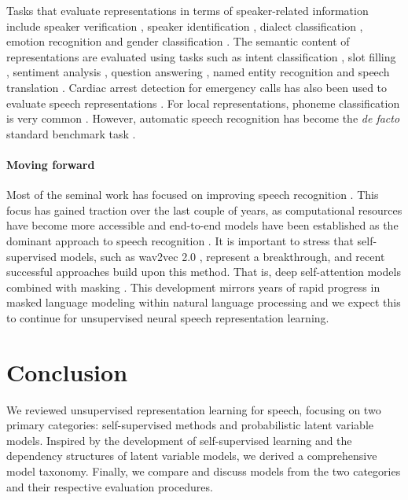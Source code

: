 {Tasks that evaluate representations in terms of speaker-related information include speaker verification \cite{hsu_unsupervised_2017, khurana_factorial_2019, milde_unspeech_2018}, speaker identification \cite{oord_representation_2018, jati_neural_2019, chung_unsupervised_2019, liu_nonautoregressive_2020}, dialect classification \cite{khurana_factorial_2019}, emotion recognition \cite{pascual_learning_2019, yang_superb_2021} and gender classification \cite{lee_unsupervised_2009}. The semantic content of representations are evaluated using tasks such as intent classification \cite{morais_endtoend_2021, yang_superb_2021}, slot filling \cite{lai_semisupervised_2021, yang_superb_2021}, sentiment analysis \cite{liu_mockingjay_2020}, question answering \cite{chung_splat_2021}, named entity recognition \cite{shon_slue_2021, borgholt_we_2021, pasad_use_2022} and speech translation \cite{bansal_speechtotext_2017, chung_generative_2020}. Cardiac arrest detection for emergency calls has also been used to evaluate speech representations \cite{borgholt_we_2021}.
For local representations, phoneme classification is very common \cite{lee_unsupervised_2009, hsu_learning_2017, chorowski_unsupervised_2019, chung_unsupervised_2019, liu_tera_2021}.
However, automatic speech recognition has become the \textit{de facto} standard benchmark task \cite{ling_decoar_2020, chung_generative_2020, hsu_hubert_2021}.

\paragraph{Moving forward} 
Most of the seminal work has focused on improving speech recognition \cite{schneider_wav2vec_2019, baevski_wav2vec_2020}. This focus has gained traction over the last couple of years, as computational resources have become more accessible and end-to-end models \cite{graves_connectionist_2006, chan_listen_2015} have been established as the dominant approach to speech recognition \cite{gulati_conformer_2020}. It is important to stress that self-supervised models, such as wav2vec 2.0 \cite{baevski_wav2vec_2020}, represent a breakthrough, and recent successful approaches build upon this method. That is, deep self-attention models combined with masking \cite{hsu_hubert_2021, wang_unispeech_2021, chen_wavlm_2021}. This development mirrors years of rapid progress in masked language modeling within natural language processing \cite{devlin_bert_2018,clark_2020_electra} and we expect this to continue for unsupervised neural speech representation learning.

\section{Conclusion}
\label{sec:conc}
We reviewed unsupervised representation learning for speech, focusing on two primary categories: self-supervised methods and probabilistic latent variable models. Inspired by the development of self-supervised learning and the dependency structures of latent variable models, we derived a comprehensive model taxonomy. Finally, we compare and discuss models from the two categories and their respective evaluation procedures.

}
